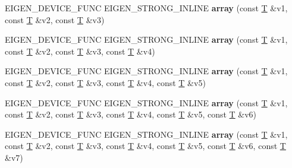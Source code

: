 \begin{DoxyCompactItemize}
E\+I\+G\+E\+N\+\_\+\+D\+E\+V\+I\+C\+E\+\_\+\+F\+U\+NC E\+I\+G\+E\+N\+\_\+\+S\+T\+R\+O\+N\+G\+\_\+\+I\+N\+L\+I\+NE {\bfseries array} (const \hyperlink{group___sparse_core___module}{T} \&v1, const \hyperlink{group___sparse_core___module}{T} \&v2, const \hyperlink{group___sparse_core___module}{T} \&v3)
\item 
\mbox{\label{class_eigen_1_1array_aca9e2d974e99dc0fb6441d90aaf22ba4}} 
E\+I\+G\+E\+N\+\_\+\+D\+E\+V\+I\+C\+E\+\_\+\+F\+U\+NC E\+I\+G\+E\+N\+\_\+\+S\+T\+R\+O\+N\+G\+\_\+\+I\+N\+L\+I\+NE {\bfseries array} (const \hyperlink{group___sparse_core___module}{T} \&v1, const \hyperlink{group___sparse_core___module}{T} \&v2, const \hyperlink{group___sparse_core___module}{T} \&v3, const \hyperlink{group___sparse_core___module}{T} \&v4)
\item 
\mbox{\label{class_eigen_1_1array_a3506835f181e0fdd76fe082cbc4b9d3f}} 
E\+I\+G\+E\+N\+\_\+\+D\+E\+V\+I\+C\+E\+\_\+\+F\+U\+NC E\+I\+G\+E\+N\+\_\+\+S\+T\+R\+O\+N\+G\+\_\+\+I\+N\+L\+I\+NE {\bfseries array} (const \hyperlink{group___sparse_core___module}{T} \&v1, const \hyperlink{group___sparse_core___module}{T} \&v2, const \hyperlink{group___sparse_core___module}{T} \&v3, const \hyperlink{group___sparse_core___module}{T} \&v4, const \hyperlink{group___sparse_core___module}{T} \&v5)
\item 
\mbox{\label{class_eigen_1_1array_ad4a1486b7b6700963be85653d0add313}} 
E\+I\+G\+E\+N\+\_\+\+D\+E\+V\+I\+C\+E\+\_\+\+F\+U\+NC E\+I\+G\+E\+N\+\_\+\+S\+T\+R\+O\+N\+G\+\_\+\+I\+N\+L\+I\+NE {\bfseries array} (const \hyperlink{group___sparse_core___module}{T} \&v1, const \hyperlink{group___sparse_core___module}{T} \&v2, const \hyperlink{group___sparse_core___module}{T} \&v3, const \hyperlink{group___sparse_core___module}{T} \&v4, const \hyperlink{group___sparse_core___module}{T} \&v5, const \hyperlink{group___sparse_core___module}{T} \&v6)
\item 
\mbox{\label{class_eigen_1_1array_a22e1f701835988db917c9d13d493e086}} 
E\+I\+G\+E\+N\+\_\+\+D\+E\+V\+I\+C\+E\+\_\+\+F\+U\+NC E\+I\+G\+E\+N\+\_\+\+S\+T\+R\+O\+N\+G\+\_\+\+I\+N\+L\+I\+NE {\bfseries array} (const \hyperlink{group___sparse_core___module}{T} \&v1, const \hyperlink{group___sparse_core___module}{T} \&v2, const \hyperlink{group___sparse_core___module}{T} \&v3, const \hyperlink{group___sparse_core___module}{T} \&v4, const \hyperlink{group___sparse_core___module}{T} \&v5, const \hyperlink{group___sparse_core___module}{T} \&v6, const \hyperlink{group___sparse_core___module}{T} \&v7)

\end{DoxyCompactItemize}
